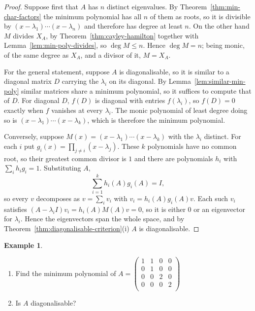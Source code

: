 \documentclass[11pt,a4paper]{article}
\theoremstyle{definition}
\newtheorem{exa}[thm]{Example}
\begin{document}
\begin{proof}
Suppose first that $A$ has $n$ distinct eigenvalues. By
Theorem~\ref{thm:min-char-factors} the minimum polynomial has all $n$ of them
as roots, so it is divisible by $(x-\lambda_1)\cdots(x-\lambda_n)$ and therefore
has degree at least $n$. On the other hand $M$ divides $X_A$, by
Theorem~\ref{thm:cayley-hamilton} together with
Lemma~\ref{lem:min-poly-divides}, so $\deg M\leq n$. Hence $\deg M=n$; being
monic, of the same degree as $X_A$, and a divisor of it, $M=X_A$.

For the general statement, suppose $A$ is diagonalisable, so it is similar to a
diagonal matrix $D$ carrying the $\lambda_i$ on its diagonal. By
Lemma~\ref{lem:similar-min-poly} similar matrices share a minimum polynomial,
so it suffices to compute that of $D$. For diagonal $D$, $f(D)$ is diagonal
with entries $f(\lambda_i)$, so $f(D)=0$ exactly when $f$ vanishes at every
$\lambda_i$. The monic polynomial of least degree doing so is
$(x-\lambda_1)\cdots(x-\lambda_k)$, which is therefore the minimum polynomial.

Conversely, suppose $M(x)=(x-\lambda_1)\cdots(x-\lambda_k)$ with the
$\lambda_i$ distinct. For each $i$ put
$g_i(x)=\prod_{j\neq i}(x-\lambda_j)$. These $k$ polynomials have no common
root, so their greatest common divisor is $1$ and there are polynomials $h_i$
with $\sum_i h_ig_i=1$. Substituting $A$,
$$\sum_{i=1}^{k}h_i(A)g_i(A)=I,$$
so every $v$ decomposes as $v=\sum_i v_i$ with $v_i=h_i(A)g_i(A)v$. Each such
$v_i$ satisfies $(A-\lambda_iI)v_i=h_i(A)M(A)v=0$, so it is either $0$ or an
eigenvector for $\lambda_i$. Hence the eigenvectors span the whole space, and
by Theorem~\ref{thm:diagonalisable-criterion}(i) $A$ is diagonalisable.
\end{proof}


\begin{exa}
\begin{enumerate}
\item[i.] Find the minimum polynomial of $A=
\begin{pmatrix}
1&1&0&0\\0&1&0&0\\0&0&2&0\\0&0&0&2\\
\end{pmatrix}
$
\item[ii.] Is $A$ diagonalisable?
\end{enumerate}
\end{exa}
\end{document}
